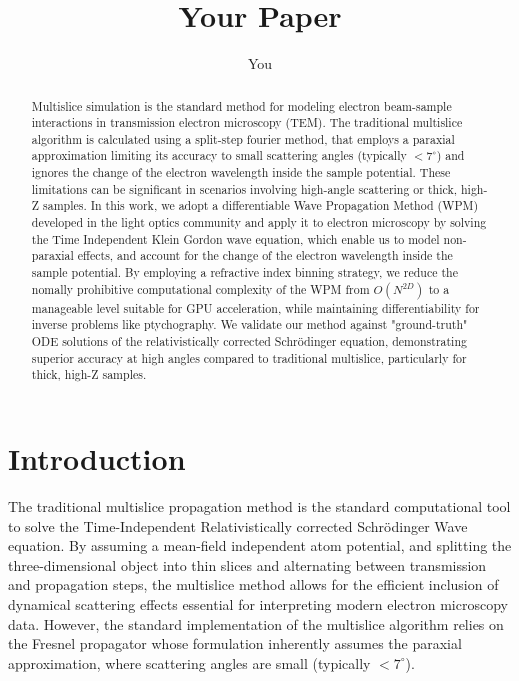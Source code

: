 \documentclass{article}
\title{Your Paper}
\author{You}
\begin{document}
\maketitle

\begin{abstract}
Multislice simulation is the standard method for modeling electron beam-sample interactions in transmission electron microscopy (TEM). 
The traditional multislice algorithm is calculated using a split-step fourier method, that employs a paraxial approximation limiting its accuracy 
to small scattering angles (typically $<7^\circ$) and ignores the change of the electron wavelength inside the sample potential.
These limitations can be significant in scenarios involving high-angle scattering or thick, high-Z samples. 
In this work, we adopt a differentiable Wave Propagation Method (WPM) developed in the light optics community and apply it to electron microscopy by solving
the Time Independent Klein Gordon wave equation, which enable us to model non-paraxial effects, and account for the change of the electron wavelength inside the sample potential.
By employing a refractive index binning strategy, we reduce the nomally prohibitive computational complexity of the WPM from $O(N^{2D})$ to a manageable level suitable for GPU acceleration, 
while maintaining differentiability for inverse problems like ptychography. We validate our method against "ground-truth" ODE solutions of the relativistically corrected Schrödinger equation, 
demonstrating superior accuracy at high angles compared to traditional multislice, particularly for thick, high-Z samples.
\end{abstract}

\section{Introduction}

The traditional multislice propagation method is the standard computational tool \cite{cowley1957scattering, kirkland2010advanced} to solve the Time-Independent Relativistically corrected Schrödinger Wave equation. 
By assuming a mean-field independent atom potential, and splitting the three-dimensional object into thin slices and alternating between transmission and propagation steps, the multislice method allows
for the efficient inclusion of dynamical scattering effects essential for interpreting modern electron microscopy data. However, the standard implementation of 
the multislice algorithm relies on the Fresnel propagator whose formulation inherently assumes the paraxial approximation, where scattering angles are small (typically $<7^\circ$). 
\end{document}
